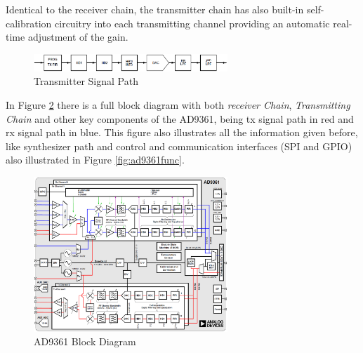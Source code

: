 Identical to the receiver chain, the transmitter chain has also built-in
self-calibration circuitry into each transmitting channel providing an automatic
real-time adjustment of the gain.

\begin{figure}[htbp]
    \centering
    \includegraphics[width=0.65\textwidth]{./figures/tx_chain}
    \caption{ Transmitter Signal Path
    \label{fig:txchain}}
\end{figure}


%

In Figure \ref{fig:ad9361blk} there is a full block diagram with both
\textit{receiver Chain}, \textit{Transmitting Chain} and other key components of
the AD9361, being tx signal path in red and rx signal path in blue. This figure
also illustrates all the information given before, like synthesizer path and
control and communication interfaces (SPI and GPIO) also illustrated in Figure
\ref{fig:ad9361func}.

\begin{figure}[htbp]
    \centering
    \includegraphics[width=0.65\textwidth]{./figures/ad9361_block_diagram}
    \caption{ AD9361 Block Diagram
    \label{fig:ad9361blk}}
\end{figure}

